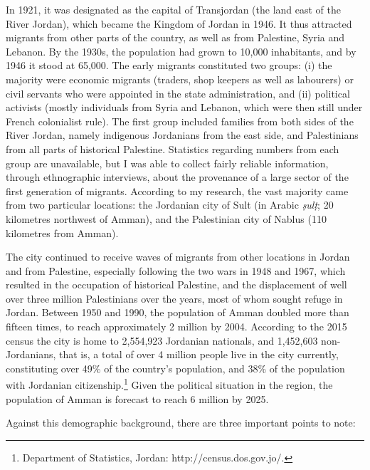 \documentclass[output=paper]{langsci/langscibook}
\begin{document}
In 1921, it was designated as the capital of Transjordan (the land east of the River Jordan), which became the Kingdom of Jordan in 1946. It thus attracted migrants from other parts of the country, as well as from Palestine, Syria and Lebanon. By the 1930s, the population had grown to 10,000 inhabitants, and by 1946 it stood at 65,000. The early migrants constituted two groups: (i) the majority were economic migrants (traders, shop keepers as well as labourers) or civil servants who were appointed in the state administration, and (ii) political activists (mostly individuals from Syria and Lebanon, which were then still under French colonialist rule). The first group included families from both sides of the River Jordan, namely indigenous Jordanians from the east side, and Palestinians from all parts of historical Palestine. Statistics regarding numbers from each group are unavailable, but I was able to collect fairly reliable information, through ethnographic interviews, about the provenance of a large sector of the first generation of migrants. According to my research, the vast majority came from two particular locations: the Jordanian city of Sult (in Arabic \textit{ṣulṭ}; 20 kilometres northwest of Amman), and the Palestinian city of Nablus (110 kilometres from Amman).

The city continued to receive waves of migrants from other locations in Jordan and from Palestine, especially following the two wars in 1948 and 1967, which resulted in the occupation of historical Palestine, and the displacement of well over three million Palestinians over the years, most of whom sought refuge in Jordan. Between 1950 and 1990, the population of Amman doubled more than fifteen times, to reach approximately 2 million by 2004. According to the 2015 census the city is home to 2,554,923 Jordanian nationals, and 1,452,603 non-Jordanians, that is, a total of over 4 million people live in the city currently, constituting over 49\% of the country’s population, and 38\% of the population with Jordanian citizenship.\footnote{Department of Statistics, Jordan: http://census.dos.gov.jo/.} Given the political situation in the region, the population of Amman is forecast to reach 6 million by 2025. 

Against this demographic background, there are three important points to note:
\end{document}
